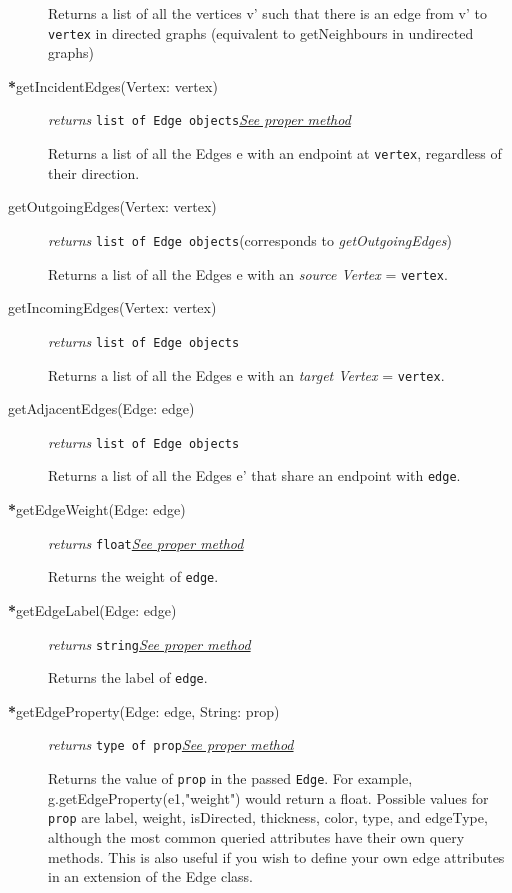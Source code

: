 \begin{description}
Returns a list of all the vertices v' such that there is an edge from v' to \texttt{vertex} in directed graphs (equivalent to getNeighbours in undirected graphs)

\item[\textbf{*}getIncidentEdges(Vertex: vertex)]\emph{returns} \texttt{list of Edge objects}\quad \hyperref[getIncidentEdgesClass]{\textit{See proper method}}


Returns a list of all the Edges e with an endpoint at \texttt{vertex}, regardless of their direction.

\label{getOutgoingEdgesClass}\item[getOutgoingEdges(Vertex: vertex)]\emph{returns} \texttt{list of Edge objects}\quad(corresponds to \textit{getOutgoingEdges})

Returns a list of all the Edges e with an \textit{source Vertex} = \texttt{vertex}.

\item[getIncomingEdges(Vertex: vertex)]\emph{returns} \texttt{list of Edge objects}

Returns a list of all the Edges e with an \textit{target Vertex} = \texttt{vertex}.

\item[getAdjacentEdges(Edge: edge)]\emph{returns}
  \texttt{list of Edge objects}

Returns a list of all the Edges e' that share an endpoint with \texttt{edge}.

\item[\textbf{*}getEdgeWeight(Edge: edge)]\emph{returns} \texttt{float}\quad \hyperref[getEdgeWeightClass]{\textit{See proper method}}

Returns the weight of \texttt{edge}.

\item[\textbf{*}getEdgeLabel(Edge: edge)]\emph{returns} \texttt{string}\quad \hyperref[getEdgeLabelClass]{\textit{See proper method}}

Returns the label of \texttt{edge}.

\item[\textbf{*}getEdgeProperty(Edge: edge, String: prop)]\emph{returns} \texttt{type of prop}\quad \hyperref[getEdgePropertyClass]{\textit{See proper method}}

Returns the value of \texttt{prop} in the passed \texttt{Edge}. For example, g.getEdgeProperty(e1,"weight") would return a float. Possible values for \texttt{prop} are label, weight, isDirected, thickness, color, type, and edgeType, although the most common queried attributes have their own query methods. This is also useful if you wish to define your own edge attributes in an extension of the Edge class.


\end{description}
